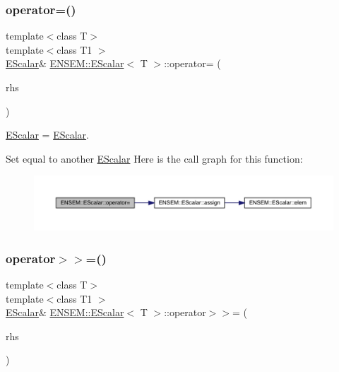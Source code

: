 \subsubsection{\texorpdfstring{operator=()}{operator=()}\hspace{0.1cm}{\footnotesize\ttfamily [12/12]}}
{\footnotesize\ttfamily template$<$class T$>$ \\
template$<$class T1 $>$ \\
\mbox{\hyperlink{classENSEM_1_1EScalar}{E\+Scalar}}\& \mbox{\hyperlink{classENSEM_1_1EScalar}{E\+N\+S\+E\+M\+::\+E\+Scalar}}$<$ T $>$\+::operator= (\begin{DoxyParamCaption}\item[{const \mbox{\hyperlink{classENSEM_1_1EScalar}{E\+Scalar}}$<$ T1 $>$ \&}]{rhs }\end{DoxyParamCaption})\hspace{0.3cm}{\ttfamily [inline]}}



\mbox{\hyperlink{classENSEM_1_1EScalar}{E\+Scalar}} = \mbox{\hyperlink{classENSEM_1_1EScalar}{E\+Scalar}}. 

Set equal to another \mbox{\hyperlink{classENSEM_1_1EScalar}{E\+Scalar}} Here is the call graph for this function\+:
\nopagebreak
\begin{figure}[H]
\begin{center}
\leavevmode
\includegraphics[width=350pt]{d0/d82/classENSEM_1_1EScalar_a8ec804b8b082a748bb364fbb4a511757_cgraph}
\end{center}
\end{figure}
\mbox{\label{classENSEM_1_1EScalar_a0e520529327800038c3775d195819b6f}} 
\subsubsection{\texorpdfstring{operator$>$$>$=()}{operator>>=()}\hspace{0.1cm}{\footnotesize\ttfamily [1/3]}}
{\footnotesize\ttfamily template$<$class T$>$ \\
template$<$class T1 $>$ \\
\mbox{\hyperlink{classENSEM_1_1EScalar}{E\+Scalar}}\& \mbox{\hyperlink{classENSEM_1_1EScalar}{E\+N\+S\+E\+M\+::\+E\+Scalar}}$<$ T $>$\+::operator$>$$>$= (\begin{DoxyParamCaption}\item[{const \mbox{\hyperlink{classENSEM_1_1EScalar}{E\+Scalar}}$<$ T1 $>$ \&}]{rhs }\end{DoxyParamCaption})\hspace{0.3cm}{\ttfamily [inline]}}




